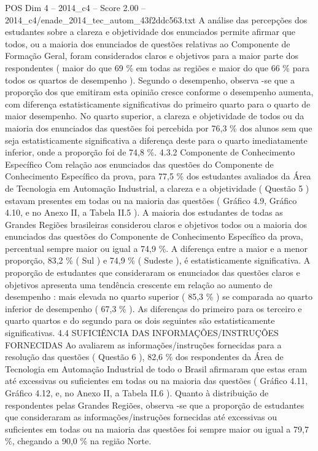\begin{textsample}{POS Dim 4 – 2014\_c4 – Score 2.00 – 2014\_c4/enade\_2014\_tec\_autom\_43f2ddc563.txt}
A análise das percepções dos estudantes sobre a clareza e objetividade dos enunciados permite afirmar que todos, ou a maioria dos enunciados de questões relativas ao Componente de Formação Geral, foram considerados claros e objetivos para a maior parte dos respondentes ( maior do que 69 \% em todas as regiões e maior do que 66 \% para todos os quartos de desempenho ).
Segundo o desempenho, observa -se que a proporção dos que emitiram esta opinião cresce conforme o desempenho aumenta, com diferença estatisticamente significativas do primeiro quarto para o quarto de maior desempenho.
No quarto superior, a clareza e objetividade de todos ou da maioria dos enunciados das questões foi percebida por 76,3 \% dos alunos sem que seja estatisticamente significativa a diferença deste para o quarto imediatamente inferior, onde a proporção foi de 74,8 \%. 4.3.2 Componente de Conhecimento Específico Com relação aos enunciados das questões do Componente de Conhecimento Específico da prova, para 77,5 \% dos estudantes avaliados da Área de Tecnologia em Automação Industrial, a clareza e a objetividade ( Questão 5 ) estavam presentes em todas ou na maioria das questões ( Gráfico 4.9, Gráfico 4.10, e no Anexo II, a Tabela II.5 ).
A maioria dos estudantes de todas as Grandes Regiões brasileiras considerou claros e objetivos todos ou a maioria dos enunciados das questões do Componente de Conhecimento Específico da prova, percentual sempre maior ou igual a 74,9 \%.
A diferença entre a maior e a menor proporção, 83,2 \% ( Sul ) e 74,9 \% ( Sudeste ), é estatisticamente significativa.
A proporção de estudantes que consideraram os enunciados das questões claros e objetivos apresenta uma tendência crescente em relação ao aumento de desempenho : mais elevada no quarto superior ( 85,3 \% ) se comparada ao quarto inferior de desempenho ( 67,3 \% ).
As diferenças do primeiro para os terceiro e quarto quartos e do segundo para os dois seguintes são estatisticamente significativas. 4.4 SUFICIÊNCIA DAS INFORMAÇÕES/INSTRUÇÕES FORNECIDAS Ao avaliarem as informações/instruções fornecidas para a resolução das questões ( Questão 6 ), 82,6 \% dos respondentes da Área de Tecnologia em Automação Industrial de todo o Brasil afirmaram que estas eram até excessivas ou suficientes em todas ou na maioria das questões ( Gráfico 4.11, Gráfico 4.12, e, no Anexo II, a Tabela II.6 ).
Quanto à distribuição de respondentes pelas Grandes Regiões, observa -se que a proporção de estudantes que consideraram as informações/instruções fornecidas até excessivas ou suficientes em todas ou na maioria das questões foi sempre maior ou igual a 79,7 \%, chegando a 90,0 \% na região Norte.

\end{textsample}
